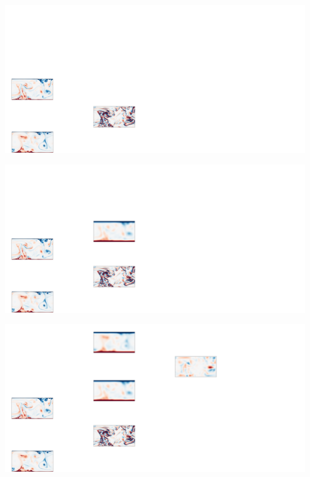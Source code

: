 \documentclass[12pt, aspectratio=169]{beamer}
\begin{document}
\begin{frame}
\centering
\includegraphics[width=\linewidth]{figures/method2.pdf}
\end{frame}

\begin{frame}
\centering
\includegraphics[width=\linewidth]{figures/method3.pdf}
\end{frame}

\begin{frame}
\centering
\includegraphics[width=\linewidth]{figures/method4.pdf}
\end{frame}
\end{document}
